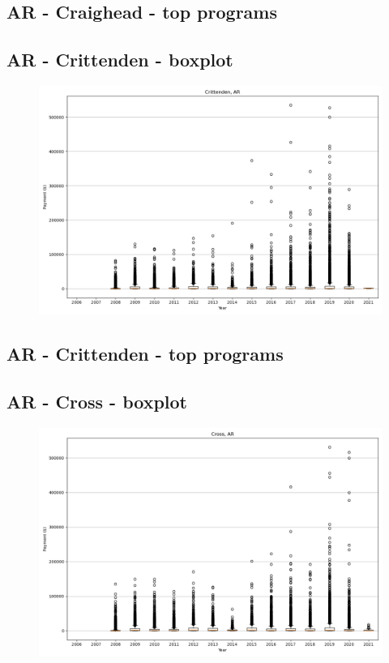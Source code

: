 \subsection*{AR - Craighead - top programs}

\newpage
\subsection*{AR - Crittenden - boxplot}
\begin{figure}[h]
\centering
\includegraphics[width=7in]{../output/boxplots/counties/Crittenden-AR_boxplot.png}
\end{figure}


\subsection*{AR - Crittenden - top programs}

\newpage
\subsection*{AR - Cross - boxplot}
\begin{figure}[h]
\centering
\includegraphics[width=7in]{../output/boxplots/counties/Cross-AR_boxplot.png}
\end{figure}


